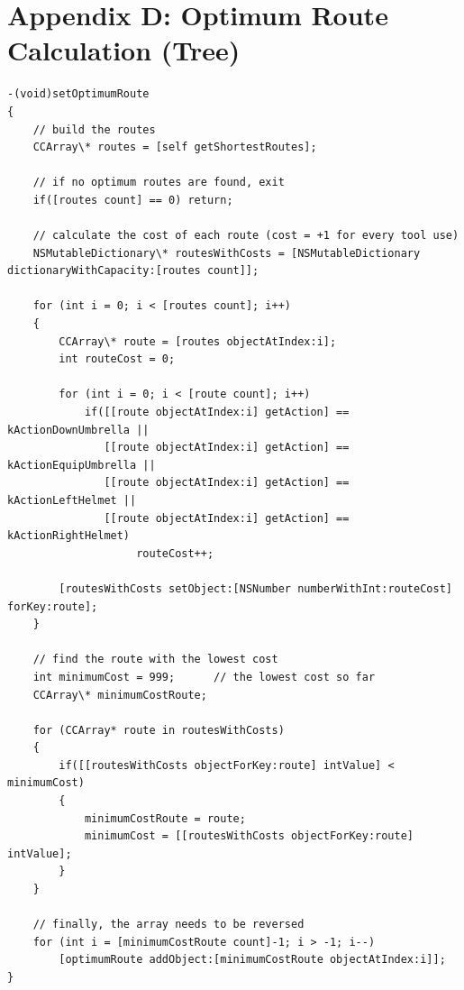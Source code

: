 \documentclass[a4paper,oneside]{report}
\begin{document}
\section{Appendix D: Optimum Route Calculation (Tree)}
\begin{lstlisting}
-(void)setOptimumRoute
{    
    // build the routes
    CCArray\* routes = [self getShortestRoutes];
    
    // if no optimum routes are found, exit
    if([routes count] == 0) return;
    
    // calculate the cost of each route (cost = +1 for every tool use)
    NSMutableDictionary\* routesWithCosts = [NSMutableDictionary dictionaryWithCapacity:[routes count]];
    
    for (int i = 0; i < [routes count]; i++) 
    {
        CCArray\* route = [routes objectAtIndex:i];
        int routeCost = 0;
        
        for (int i = 0; i < [route count]; i++) 
            if([[route objectAtIndex:i] getAction] == kActionDownUmbrella ||
               [[route objectAtIndex:i] getAction] == kActionEquipUmbrella ||
               [[route objectAtIndex:i] getAction] == kActionLeftHelmet ||
               [[route objectAtIndex:i] getAction] == kActionRightHelmet) 
                    routeCost++;
        
        [routesWithCosts setObject:[NSNumber numberWithInt:routeCost] forKey:route];
    }
    
    // find the route with the lowest cost
    int minimumCost = 999;      // the lowest cost so far
    CCArray\* minimumCostRoute;
    
    for (CCArray* route in routesWithCosts) 
    {
        if([[routesWithCosts objectForKey:route] intValue] < minimumCost)
        {
            minimumCostRoute = route;
            minimumCost = [[routesWithCosts objectForKey:route] intValue];
        }
    }
    
    // finally, the array needs to be reversed
    for (int i = [minimumCostRoute count]-1; i > -1; i--) 
        [optimumRoute addObject:[minimumCostRoute objectAtIndex:i]];
}
\end{lstlisting}
\newpage


	
%
%

\singlespace

\newpage
{}


\end{document}
